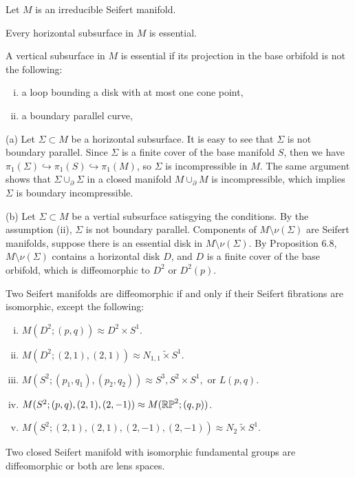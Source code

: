 \documentclass{../../../small}
\begin{document}
\begin{prop}
Let $M$ is an irreducible Seifert manifold.
\begin{parts}
\item Every horizontal subsurface in $M$ is essential.
\item A vertical subsurface in $M$ is essential if its projection in the base orbifold is not the following:
\begin{enumerate}[(i)]
\item a loop bounding a disk with at most one cone point,
\item a boundary parallel curve,
\end{enumerate}
\end{parts}
\end{prop}

\begin{pf}[Sketch]
(a)
Let $\Sigma\subset M$ be a horizontal subsurface.
It is easy to see that $\Sigma$ is not boundary parallel.
Since $\Sigma$ is a finite cover of the base manifold $S$, then we have $\pi_1(\Sigma)\hookrightarrow\pi_1(S)\hookrightarrow\pi_1(M)$, so $\Sigma$ is incompressible in $M$.
The same argument shows that $\Sigma\cup_\partial\Sigma$ in a closed manifold $M\cup_\partial M$ is incompressible, which implies $\Sigma$ is boundary incompressible.

(b)
Let $\Sigma\subset M$ be a vertial subsurface satisgying the conditions.
By the assumption (ii), $\Sigma$ is not boundary parallel.
Components of $M\setminus\nu(\Sigma)$ are Seifert manifolds, suppose there is an essential disk in $M\setminus\nu(\Sigma)$.
By Proposition 6.8, $M\setminus\nu(\Sigma)$ contains a horizontal disk $D$, and $D$ is a finite cover of the base orbifold, which is diffeomorphic to $D^2$ or $D^2(p)$.
\end{pf}

\begin{thm}
Two Seifert manifolds are diffeomorphic if and only if their Seifert fibrations are isomorphic, except the following:
\begin{enumerate}[(i)]
\item $M(D^2;(p,q))\approx D^2\times S^1$.
\item $M(D^2;(2,1),(2,1))\approx N_{1,1}\tilde\times S^1$.
\item $M(S^2;(p_1,q_1),(p_2,q_2))\approx S^3,S^2\times S^1,\text{ or }L(p,q)$.
\item $M(S^2;(p,q),(2,1),(2,-1))\approx M(\mathbb{RP}^2;(q,p))$.
\item $M(S^2;(2,1),(2,1),(2,-1),(2,-1))\approx N_2\tilde\times S^1$.
\end{enumerate}
\end{thm}
\begin{thm}
Two closed Seifert manifold with isomorphic fundamental groups are diffeomorphic or both are lens spaces.
\end{thm}
\end{document}
